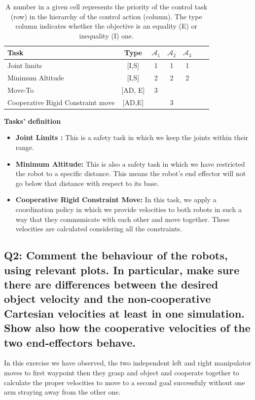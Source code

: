 \documentclass{article}
\begin{document}
\begin{table}[htb]
	\label {tbl:actions_tables}
	\begin{center}
		\footnotesize
		\begin{tabular}{lcccccc}
			\toprule		
			Task & Type & $\mathcal{A}_{1}$ & $\mathcal{A}_{2}$  & $\mathcal{A}_{3}$  \\
			\midrule
			Joint limits                      & [I,S] & 1 & 1 &  1\\
			\hdashline
			Minimum Altitude						&[I,S] & 2& 2 & 2\\
			\hdashline 
			Move-To					&[AD, E] &3 & & \\
			\hdashline 
			Cooperative Rigid Constraint move					& [AD,E] & & 3 & \\
			
			\bottomrule
		\end{tabular}
	\end{center}
	\caption{A number in a given cell represents the priority of the control task (row) in the hierarchy of the control action (column). The type column indicates whether the objective is an equality (E) or inequality (I) one.}
\end{table}

\noindent
\textbf{Tasks' definition}
\begin{itemize}
	\item \textbf{Joint Limits :} This is a safety task in which we keep the joints within their range.
	\item \textbf{Minimum Altitude:} This is also a safety task in which we have restricted the robot to a specific distance. This means the robot's end effector will not go below that distance with respect to its base. 
	\item \textbf{Cooperative Rigid Constraint Move:} In this task, we apply a coordination policy in which we provide velocities to both robots in such a way that they communicate with each other and move together. These velocities are calculated considering all the constraints.
\end{itemize}
\subsection{Q2: Comment the behaviour of the robots, using relevant plots. In particular, make sure there are differences between the desired object velocity and the non-cooperative Cartesian velocities at least in one simulation. Show also how the cooperative velocities of the two end-effectors behave.}
In this exercise we have observed, the two independent left and right manipulator moves to first waypoint then they grasp and object and cooperate together to calculate the proper velocities to move to a second goal successfuly without one arm straying away from the other one.
\end{document}
